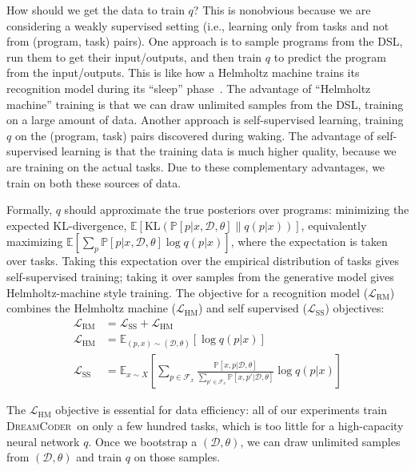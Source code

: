\documentclass{article}
\newcommand{\system}{\textsc{DreamCoder}~}
\newcommand{\expect}{\mathds{E}} %
\newcommand{\probability}{\mathds{P}} %
\begin{document}
How should we get the data to train $q$?
This is nonobvious  because we are considering a weakly supervised setting (i.e., learning only from tasks and not from (program, task) pairs).
One approach is to sample programs from the DSL,
run them to get their input/outputs,
and then train $q$ to predict the program from the input/outputs.
This is like how a Helmholtz machine
trains its recognition model during its ``sleep'' phase~\cite{dayan1995helmholtz}.
The advantage of ``Helmholtz machine'' training is that
we can draw unlimited samples from the DSL,
training on a large amount of data.
Another approach is
 self-supervised learning,
training $q$ on the (program, task)
pairs discovered during waking.
The advantage of self-supervised learning
is that the training data is much higher quality,
because we are training on the actual tasks.
Due to these complementary advantages,
we train on both these sources of data.

Formally, $q$ should approximate the true posteriors over programs: minimizing the expected KL-divergence, $  \expect\left[\text{KL}\left(\probability[p|x,\mathcal{D},\theta]\|q(p|x) \right) \right]$,
 equivalently maximizing $  \expect[\sum_p\probability[p|x,\mathcal{D},\theta]\log q(p|x) ]$,
 where the expectation is taken over tasks. Taking this expectation over the empirical distribution of tasks gives self-supervised training; taking it over samples from the generative model gives  Helmholtz-machine style training.
 The  objective for a recognition model ($\mathcal{L}_{\text{RM}}$) combines the Helmholtz machine ($\mathcal{L}_{\text{HM}}$) and self supervised ($\mathcal{L}_{\text{SS}}$) objectives:
 \begin{align}
   \mathcal{L}_{\text{RM}} &= \mathcal{L}_\text{SS} + \mathcal{L}_\text{HM}\\
\nonumber\mathcal{L}_{\text{HM}} &= \expect_{(p,x)\sim(\mathcal{D},\theta) }\left[\log q(p|x)\right]\\
\nonumber\mathcal{L}_{\text{SS}} &= \expect_{x\sim X}\left[\sum_{p\in \mathcal{F}_x}
  \frac{\probability\left[x,p|\mathcal{D},\theta \right]}{\sum_{p'\in \mathcal{F}_x}\probability\left[x,p'|\mathcal{D},\theta \right]}\log q(p|x)\right]
\end{align}

  The $\mathcal{L}_{\text{HM}}$ objective is essential for data efficiency:
all of our experiments train \system on only a few hundred tasks, which is too little for
a high-capacity neural network $q$.
Once we bootstrap a $(\mathcal{D},\theta)$,
we can draw unlimited samples from $(\mathcal{D},\theta)$
and train $q$ on those samples.
\end{document}
